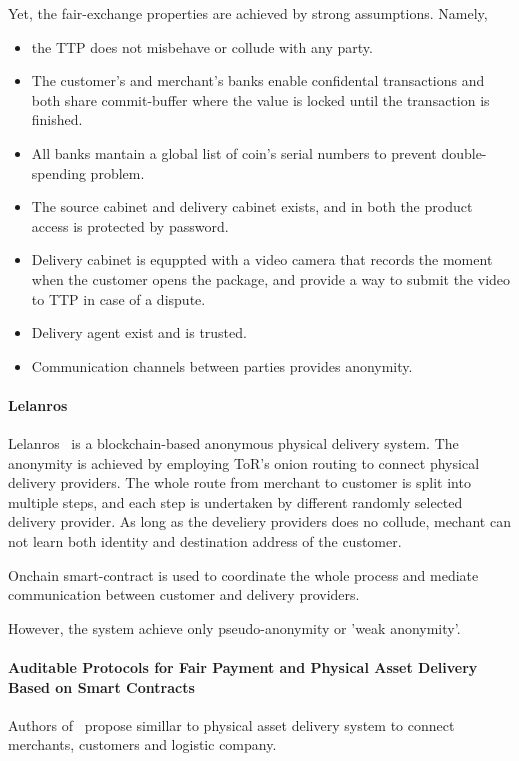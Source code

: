 \documentclass{article}
\begin{document}
Yet, the fair-exchange properties are achieved by strong assumptions. Namely, 
\begin{itemize}
    \item the TTP does not misbehave or collude with any party. 
    \item The customer's and merchant's banks enable confidental transactions and both share commit-buffer where the value is locked until the transaction is finished.   
    \item All banks mantain a global list of coin's serial numbers to prevent double-spending problem. 
    \item The source cabinet and delivery cabinet exists, and in both the product access is protected by password.
    \item Delivery cabinet is equppted with a video camera that records the moment when the customer opens the package, and provide a way to submit the video to TTP in case of a dispute. 
    \item Delivery agent exist and is trusted. 
    \item Communication channels between parties provides anonymity.
\end{itemize}



\paragraph{Lelanros} Lelanros~\cite{altawy2017lelantos} is a blockchain-based anonymous physical delivery system. The anonymity is achieved by employing ToR's onion routing to connect physical delivery providers. The whole route from merchant to customer is split into multiple steps, and each step is undertaken by different randomly selected delivery provider. As long as the develiery providers does no collude, mechant can not learn both identity and destination address of the customer.

Onchain smart-contract is used to coordinate the whole process and mediate communication between customer and delivery providers.


However, the system achieve only pseudo-anonymity or 'weak anonymity'. 

\paragraph{Auditable Protocols for Fair Payment and Physical Asset Delivery Based on Smart Contracts}
Authors of~\cite{wang2019auditable} propose simillar to \cite{altawy2017lelantos} physical asset delivery system to connect merchants, customers and logistic company.
\end{document}
